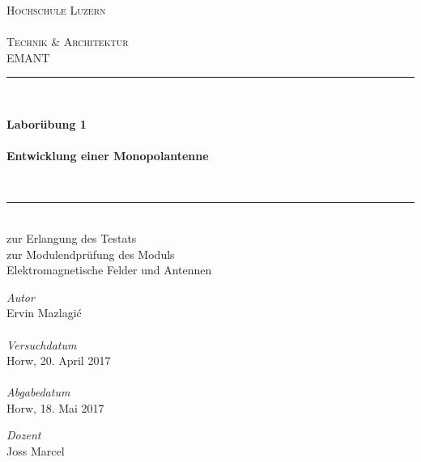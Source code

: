 \thispagestyle{empty}
\begin{titlepage}

\begin{center}

\textsc{
	\LARGE Hochschule Luzern\\~\\Technik \& Architektur}\\[1.5cm]
\vfill{}
\large EMANT
\\[0.5cm]
\newcommand{\HRule}{\rule{\linewidth}{0.5mm}}
\HRule
\\[0.4cm]
{

	\Huge \bfseries Laborübung 1 \\
        ~\\
        \large Entwicklung einer Monopolantenne}
\\[0.4cm]
\HRule
\\[0.5cm]

	\large zur Erlangung des Testats \\
		zur Modulendprüfung des Moduls \\
		Elektromagnetische Felder und Antennen

\vfill{}

\begin{minipage}{0.4\textwidth}
    \begin{flushleft} \large
	\emph{Autor}\\
        Ervin Mazlagi\'c\\ ~ \\
	\emph{Versuchdatum}\\
	Horw, 20. April 2017 \\ ~ \\
	\emph{Abgabedatum}\\
	Horw, 18. Mai 2017
    \end{flushleft}
\end{minipage}
\hfill
\begin{minipage}{0.4\textwidth}
    \begin{flushright} \large
        \emph{Dozent} \\
        Joss Marcel \\
    \end{flushright}
\end{minipage}


\end{center}
\end{titlepage}
